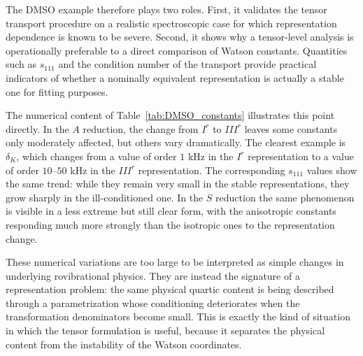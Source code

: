 \documentclass[aip,jcp,reprint,floatfix]{revtex4-2}
\begin{document}
The DMSO example therefore plays two roles. First, it validates the tensor
transport procedure on a realistic spectroscopic case for which representation
dependence is known to be severe. Second, it shows why a tensor-level analysis
is operationally preferable to a direct comparison of Watson constants.
Quantities such as $s_{111}$ and the condition number of the transport provide
practical indicators of whether a nominally equivalent representation is
actually a stable one for fitting purposes.

The numerical content of Table~\ref{tab:DMSO_constants} illustrates this point
directly. In the $A$ reduction, the change from $I^r$ to $III^r$ leaves some
constants only moderately affected, but others vary dramatically. The clearest
example is $\delta_K$, which changes from a value of order $1$ kHz in the
$I^r$ representation to a value of order $10$--$50$ kHz in the $III^r$
representation. The corresponding $s_{111}$ values show the same trend: while
they remain very small in the stable representations, they grow sharply in the
ill-conditioned one. In the $S$ reduction the same phenomenon is visible in a
less extreme but still clear form, with the anisotropic constants responding
much more strongly than the isotropic ones to the representation change.

These numerical variations are too large to be interpreted as simple changes
in underlying rovibrational physics. They are instead the signature of a
representation problem: the same physical quartic content is being described
through a parametrization whose conditioning deteriorates when the transformation
denominators become small. This is exactly the kind of situation in which the
tensor formulation is useful, because it separates the physical content from
the instability of the Watson coordinates.
\end{document}
